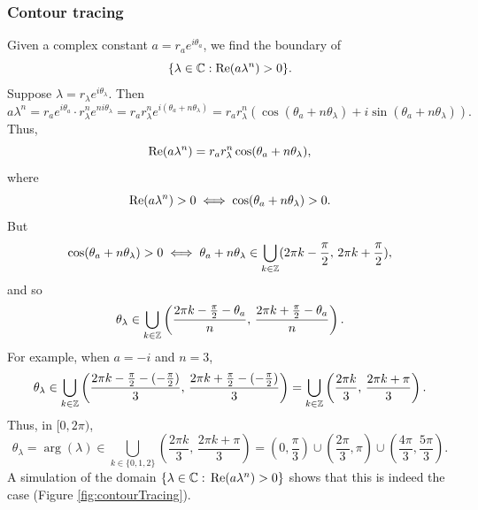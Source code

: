 \documentclass[11pt, oneside, a4paper]{article}
\begin{document}
\subsubsection{Contour tracing}
Given a complex constant $a=r_a e^{i\theta_a}$, we find the boundary of
\[\{\lambda\in\mathbb C: \mathrm{Re}(a\lambda^n)>0\}.\]
Suppose $\lambda=r_\lambda e^{i\theta_\lambda}$. Then
\[a\lambda^n = r_ae^{i\theta_a}\cdot r_\lambda^n e^{ni\theta_\lambda} = r_a r_\lambda^n e^{i(\theta_a+n\theta_\lambda)} = r_ar_\lambda^n(\cos(\theta_a+n\theta_\lambda) + i\sin(\theta_a+n\theta_\lambda)).\]
Thus,
\[\mathrm{Re}(a\lambda^n) = r_ar_\lambda^n \cos(\theta_a+n\theta_\lambda),\]
where
\[\mathrm{Re}(a\lambda^n)>0 \iff \cos(\theta_a+n\theta_\lambda)>0.\]
But
\[\cos(\theta_a+n\theta_\lambda)>0 \iff \theta_a+n\theta_\lambda\in \bigcup_{k\in\mathbb Z}(2\pi k -\frac{\pi}{2},\,2\pi k + \frac{\pi}{2}),\]
and so
\[\theta_\lambda\in \bigcup_{k\in\mathbb Z}\left(\frac{2\pi k -\frac{\pi}{2}-\theta_a}{n},\,\frac{2\pi k + \frac{\pi}{2}-\theta_a}{n}\right).\]
For example, when $a=-i$ and $n=3$,
\[\theta_\lambda\in \bigcup_{k\in\mathbb Z}\left(\frac{2\pi k -\frac{\pi}{2}-(-\frac{\pi}{2})}{3},\,\frac{2\pi k + \frac{\pi}{2}-(-\frac{\pi}{2})}{3}\right) = \bigcup_{k\in\mathbb Z}\left(\frac{2\pi k}{3},\,\frac{2\pi k + \pi}{3}\right).\]
Thus, in $[0,2\pi)$,
\[\theta_\lambda=\arg(\lambda)\in \bigcup_{k\in\{0,1,2\}}\left(\frac{2\pi k}{3},\,\frac{2\pi k + \pi}{3}\right) = (0,\frac{\pi}{3})\cup (\frac{2\pi}{3}, \pi)\cup (\frac{4\pi}{3}, \frac{5\pi}{3}).\]
A simulation of the domain $\{\lambda\in\mathbb C:\,\mathrm{Re}(a\lambda^n)>0\}$ shows that this is indeed the case (Figure \ref{fig:contourTracing}).
\end{document}
